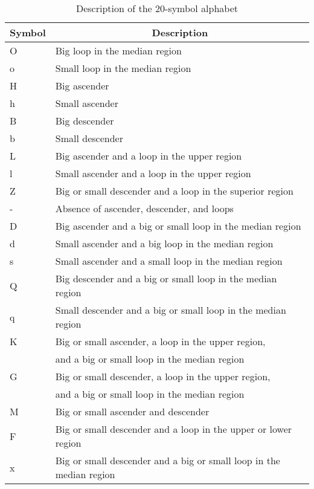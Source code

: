 \documentclass{article}[14pt, oneside, a4paper, times]
\begin{document}
\begin{table} [ht!]
\caption {Description of the 20-symbol alphabet}
\begin{center}
\begin{tabular}{ll} \hline 
 \multicolumn{1}{c}{Symbol}&
 \multicolumn{1}{c}{Description} \\ \hline

O & Big loop in the median region \\
o & Small loop in the median region \\
H & Big ascender \\
h & Small ascender \\
B & Big descender\\
b & Small descender \\
L & Big ascender and a loop in the upper region\\
l & Small ascender and a loop in the upper region\\
Z & Big or small descender and a loop in the superior region\\
- & Absence of ascender, descender, and loops\\
D & Big ascender and a big or small loop in the median region\\
d & Small ascender and a big loop in the median region\\
s & Small ascender and a small loop in the median region\\
Q & Big descender and a big or small loop in the median region\\
q & Small descender and a big or small loop in the median region\\
K & Big or small ascender, a loop in the upper region, \\
  & and a big or small loop in the median region\\
G & Big or small descender, a loop in the upper region, \\
  & and a big or small loop in the median region\\
M & Big or small ascender and descender\\
F & Big or small descender and a loop in the upper or lower region\\
x & Big or small descender and a big or small loop in the median region\\ \hline


\end{tabular}
\label{symbols:tab}
\end{center}
\end{table}
\end{document}
